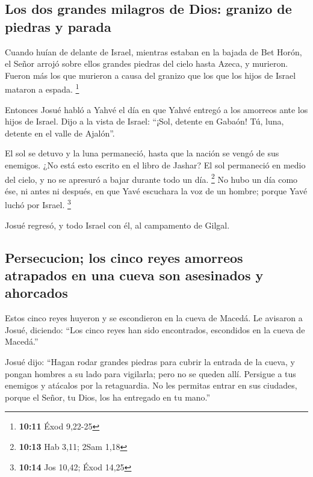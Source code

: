 \begin{paracol}{2}
\hypertarget{los-dos-grandes-milagros-de-dios-granizo-de-piedras-y-parada}{%
\subsection{Los dos grandes milagros de Dios: granizo de piedras y
parada}\label{los-dos-grandes-milagros-de-dios-granizo-de-piedras-y-parada}}

 Cuando huían de delante de Israel, mientras estaban en
la bajada de Bet Horón, el Señor arrojó sobre ellos grandes piedras del
cielo hasta Azeca, y murieron. Fueron más los que murieron a causa del
granizo que los que los hijos de Israel mataron a espada. \footnote{\textbf{10:11}
  Éxod 9,22-25}

 Entonces Josué habló a Yahvé el día en que Yahvé entregó
a los amorreos ante los hijos de Israel. Dijo a la vista de Israel:
``¡Sol, detente en Gabaón! Tú, luna, detente en el valle de Ajalón''.

 El sol se detuvo y la luna permaneció, hasta que la
nación se vengó de sus enemigos. ¿No está esto escrito en el libro de
Jashar? El sol permaneció en medio del cielo, y no se apresuró a bajar
durante todo un día. \footnote{\textbf{10:13} Hab 3,11; 2Sam 1,18}
 No hubo un día como ése, ni antes ni después, en que
Yavé escuchara la voz de un hombre; porque Yavé luchó por Israel.
\footnote{\textbf{10:14} Jos 10,42; Éxod 14,25}

 Josué regresó, y todo Israel con él, al campamento de
Gilgal.

\hypertarget{persecucion-los-cinco-reyes-amorreos-atrapados-en-una-cueva-son-asesinados-y-ahorcados}{%
\subsection{Persecucion; los cinco reyes amorreos atrapados en una cueva
son asesinados y
ahorcados}\label{persecucion-los-cinco-reyes-amorreos-atrapados-en-una-cueva-son-asesinados-y-ahorcados}}

 Estos cinco reyes huyeron y se escondieron en la cueva
de Macedá.  Le avisaron a Josué, diciendo: ``Los cinco
reyes han sido encontrados, escondidos en la cueva de Macedá.''

 Josué dijo: ``Hagan rodar grandes piedras para cubrir la
entrada de la cueva, y pongan hombres a su lado para vigilarla;
 pero no se queden allí. Persigue a tus enemigos y
atácalos por la retaguardia. No les permitas entrar en sus ciudades,
porque el Señor, tu Dios, los ha entregado en tu mano.''


\end{paracol}
